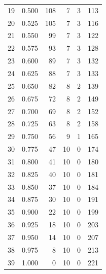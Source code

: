 \documentclass[a4paper,twoside,12pt]{book}
\begin{document}
\begin{appendices}
\begin{table}
\begin{tabular}{lrrrrr}
		19 &  0.500 &       108 &         7 &               3 &             113 \\
		20 &  0.525 &       105 &         7 &               3 &             116 \\
		21 &  0.550 &        99 &         7 &               3 &             122 \\
		22 &  0.575 &        93 &         7 &               3 &             128 \\
		23 &  0.600 &        89 &         7 &               3 &             132 \\
		24 &  0.625 &        88 &         7 &               3 &             133 \\
		25 &  0.650 &        82 &         8 &               2 &             139 \\
		26 &  0.675 &        72 &         8 &               2 &             149 \\
		27 &  0.700 &        69 &         8 &               2 &             152 \\
		28 &  0.725 &        63 &         8 &               2 &             158 \\
		29 &  0.750 &        56 &         9 &               1 &             165 \\
		30 &  0.775 &        47 &        10 &               0 &             174 \\
		31 &  0.800 &        41 &        10 &               0 &             180 \\
		32 &  0.825 &        40 &        10 &               0 &             181 \\
		33 &  0.850 &        37 &        10 &               0 &             184 \\
		34 &  0.875 &        30 &        10 &               0 &             191 \\
		35 &  0.900 &        22 &        10 &               0 &             199 \\
		36 &  0.925 &        18 &        10 &               0 &             203 \\
		37 &  0.950 &        14 &        10 &               0 &             207 \\
		38 &  0.975 &         8 &        10 &               0 &             213 \\
		39 &  1.000 &         0 &        10 &               0 &             221 \\
		\bottomrule
	\end{tabular}		
\end{table} 



\end{appendices}
\end{document}
